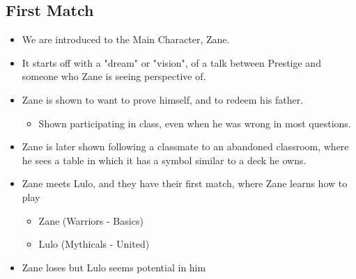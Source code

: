\subsection{First Match} %
%
\begin{itemize} %
    \item We are introduced to the Main Character, Zane.
    \item It starts off with a "dream" or "vision", of a talk between Prestige and 
    someone who Zane is seeing perspective of. 
    \item Zane is shown to want to prove himself, and to redeem his father. 
        \begin{itemize}
            \item Shown participating in class, even when he was wrong in most questions. 
        \end{itemize}
    \item Zane is later shown following a classmate to an abandoned classroom, where 
    he sees a table in which it has a symbol similar to a deck he owns. 
    \item Zane meets Lulo, and they have their first match, where Zane learns how to play
        \begin{itemize}
            \item Zane (Warriors - Basics)
            \item Lulo (Mythicals - United)
        \end{itemize}
    \item Zane loses but Lulo seems potential in him
\end{itemize}

